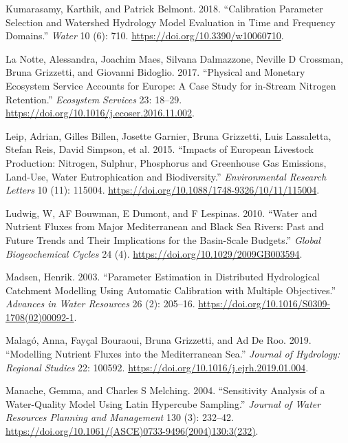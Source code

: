 \begin{CSLReferences}{1}{0}
\leavevmode{}%
Kumarasamy, Karthik, and Patrick Belmont. 2018. {``Calibration Parameter Selection and Watershed Hydrology Model Evaluation in Time and Frequency Domains.''} \emph{Water} 10 (6): 710. \url{https://doi.org/10.3390/w10060710}.

\leavevmode{}%
La Notte, Alessandra, Joachim Maes, Silvana Dalmazzone, Neville D Crossman, Bruna Grizzetti, and Giovanni Bidoglio. 2017. {``Physical and Monetary Ecosystem Service Accounts for Europe: A Case Study for in-Stream Nitrogen Retention.''} \emph{Ecosystem Services} 23: 18--29. \url{https://doi.org/10.1016/j.ecoser.2016.11.002}.

\leavevmode{}%
Leip, Adrian, Gilles Billen, Josette Garnier, Bruna Grizzetti, Luis Lassaletta, Stefan Reis, David Simpson, et al. 2015. {``Impacts of European Livestock Production: Nitrogen, Sulphur, Phosphorus and Greenhouse Gas Emissions, Land-Use, Water Eutrophication and Biodiversity.''} \emph{Environmental Research Letters} 10 (11): 115004. \url{https://doi.org/10.1088/1748-9326/10/11/115004}.

\leavevmode{}%
Ludwig, W, AF Bouwman, E Dumont, and F Lespinas. 2010. {``Water and Nutrient Fluxes from Major Mediterranean and Black Sea Rivers: Past and Future Trends and Their Implications for the Basin-Scale Budgets.''} \emph{Global Biogeochemical Cycles} 24 (4). \url{https://doi.org/10.1029/2009GB003594}.

\leavevmode{}%
Madsen, Henrik. 2003. {``Parameter Estimation in Distributed Hydrological Catchment Modelling Using Automatic Calibration with Multiple Objectives.''} \emph{Advances in Water Resources} 26 (2): 205--16. \url{https://doi.org/10.1016/S0309-1708(02)00092-1}.

\leavevmode{}%
Malagó, Anna, Fayçal Bouraoui, Bruna Grizzetti, and Ad De Roo. 2019. {``Modelling Nutrient Fluxes into the Mediterranean Sea.''} \emph{Journal of Hydrology: Regional Studies} 22: 100592. \url{https://doi.org/10.1016/j.ejrh.2019.01.004}.

\leavevmode{}%
Manache, Gemma, and Charles S Melching. 2004. {``Sensitivity Analysis of a Water-Quality Model Using Latin Hypercube Sampling.''} \emph{Journal of Water Resources Planning and Management} 130 (3): 232--42. \url{https://doi.org/10.1061/(ASCE)0733-9496(2004)130:3(232)}.


\end{CSLReferences}
